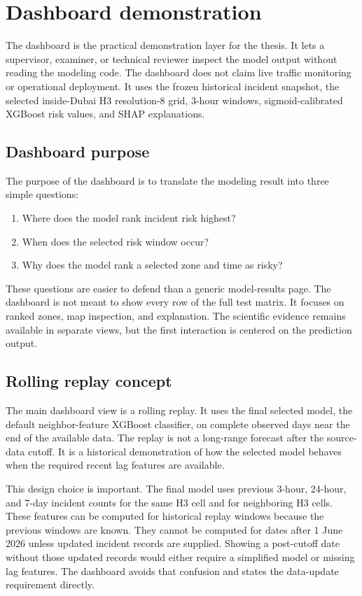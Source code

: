 \chapter{Dashboard demonstration}

The dashboard is the practical demonstration layer for the thesis. It lets a supervisor, examiner, or technical reviewer inspect the model output without reading the modeling code. The dashboard does not claim live traffic monitoring or operational deployment. It uses the frozen historical incident snapshot, the selected inside-Dubai H3 resolution-8 grid, 3-hour windows, sigmoid-calibrated XGBoost risk values, and SHAP explanations.

\section{Dashboard purpose}

The purpose of the dashboard is to translate the modeling result into three simple questions:

\begin{enumerate}
    \item Where does the model rank incident risk highest?
    \item When does the selected risk window occur?
    \item Why does the model rank a selected zone and time as risky?
\end{enumerate}

These questions are easier to defend than a generic model-results page. The dashboard is not meant to show every row of the full test matrix. It focuses on ranked zones, map inspection, and explanation. The scientific evidence remains available in separate views, but the first interaction is centered on the prediction output.

\section{Rolling replay concept}

The main dashboard view is a rolling replay. It uses the final selected model, the default neighbor-feature XGBoost classifier, on complete observed days near the end of the available data. The replay is not a long-range forecast after the source-data cutoff. It is a historical demonstration of how the selected model behaves when the required recent lag features are available.

This design choice is important. The final model uses previous 3-hour, 24-hour, and 7-day incident counts for the same H3 cell and for neighboring H3 cells. These features can be computed for historical replay windows because the previous windows are known. They cannot be computed for dates after 1 June 2026 unless updated incident records are supplied. Showing a post-cutoff date without those updated records would either require a simplified model or missing lag features. The dashboard avoids that confusion and states the data-update requirement directly.

